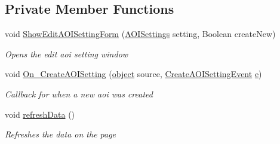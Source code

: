 \subsection*{Private Member Functions}
\begin{DoxyCompactItemize}
\item 
void \hyperlink{class_web_analyzer_1_1_u_i_1_1_interaction_objects_1_1_domain_setting_control_a8482d6c6ca6f62a8182b8b9e7608ed92}{Show\+Edit\+A\+O\+I\+Setting\+Form} (\hyperlink{class_web_analyzer_1_1_models_1_1_settings_model_1_1_a_o_i_settings}{A\+O\+I\+Settings} setting, Boolean create\+New)
\begin{DoxyCompactList}\small\item\em Opens the edit aoi setting window \end{DoxyCompactList}\item 
void \hyperlink{class_web_analyzer_1_1_u_i_1_1_interaction_objects_1_1_domain_setting_control_ab03466aaad4776710ba6517f80329b12}{On\+\_\+\+Create\+A\+O\+I\+Setting} (\hyperlink{_u_i_2_h_t_m_l_resources_2js_2lib_2underscore_8min_8js_aae18b7515bb2bc4137586506e7c0c903}{object} source, \hyperlink{class_web_analyzer_1_1_events_1_1_create_a_o_i_setting_event}{Create\+A\+O\+I\+Setting\+Event} \hyperlink{_u_i_2_h_t_m_l_resources_2js_2lib_2bootstrap_8min_8js_ab5902775854a8b8440bcd25e0fe1c120}{e})
\begin{DoxyCompactList}\small\item\em Callback for when a new aoi was created \end{DoxyCompactList}\item 
void \hyperlink{class_web_analyzer_1_1_u_i_1_1_interaction_objects_1_1_domain_setting_control_a2f4338f90019c81d050af5e37be871de}{refresh\+Data} ()
\begin{DoxyCompactList}\small\item\em Refreshes the data on the page \end{DoxyCompactList}\end{DoxyCompactItemize}
